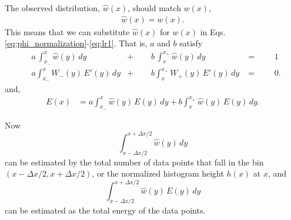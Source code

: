 \documentclass[12pt]{article}
\begin{document}
The observed distribution, $\hat w(x)$,
should match $w(x)$,
\begin{align}
  \hat w(x) = w(x).
  \label{eq:h_w}
\end{align}
%
This means that
we can substitute $\hat w(x)$ for $w(x)$ in
Eqs. \eqref{eq:phi_normalization}-\eqref{eq:lr1}.
%
That is,
$a$ and $b$ satisfy
\begin{align}
  &a \, \int_{x_-}^x \hat w(y) \, dy
  &+\phantom{=}
  &b \, \int_x^{x_+} \hat w(y) \, dy
  &=\phantom{=}
  &1
  \label{eq:h_normalization}
\\
  &a \int_{x_{-}}^x W_-(y) \, E'(y) \, dy
&+\phantom{=}
  &b \int_x^{x_{+}} W_+(y) \, E'(y) \, dy
  &=\phantom{=}
  &0.
\label{eq:lrw_constraint}
\end{align}
%
and,
\begin{align}
  E(x)
&=
  a \int_{x_{-}}^x \hat w(y) \, E(y) \, dy
+
  b \int_x^{x_{+}} \hat w(y) \, E(y) \, dy.
\label{eq:lrw}
\end{align}



Now
\[
  \int_{x - \Delta x/2}^{x + \Delta x/2} \hat w(y) \, dy
\]
can be estimated by the total number of data points
that fall in the bin $(x - \Delta x/2, x + \Delta x/2)$,
or the normalized histogram height $h(x)$ at $x$,
and
\[
  \int_{x - \Delta x/2}^{x + \Delta x/2} \hat w(y) \, E(y) \, dy
\]
can be estimated as the total energy of the data points.
\end{document}
